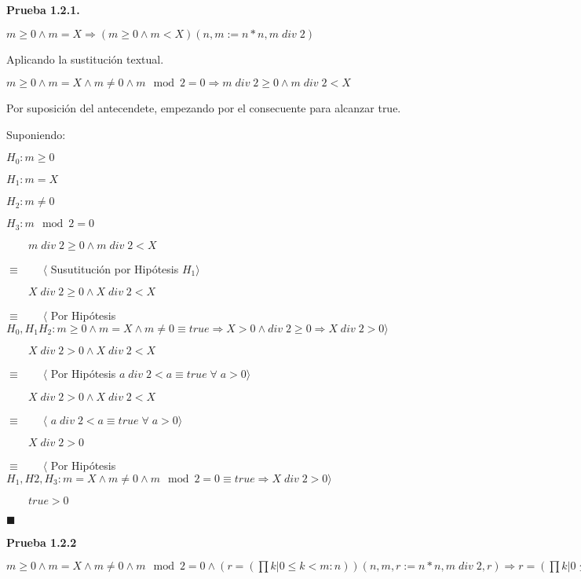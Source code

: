 \documentclass[hidelinks]{article}
\begin{document}
\textbf{Prueba 1.2.1.}\par
$m \geq 0 \land m = X \Rightarrow (m \geq 0 \land m < X)(n,m := n * n, m \; div \; 2)$\par
Aplicando la sustitución textual.\par
$m \geq 0 \land m = X \land m \neq 0 \land m \mod 2 = 0 \Rightarrow m \; div \; 2 \geq 0 \land m \; div \; 2 < X$\par

Por suposición del antecendete, empezando por el consecuente para alcanzar
true.\par

Suponiendo:\par
$H_0: m \geq 0$\par
$H_1: m = X$\par
$H_2: m \neq 0$\par
$H_3: m \mod 2 = 0$\par

$\qquad m \; div \; 2 \geq 0 \land m \; div \; 2 < X$\par
$\equiv \qquad \langle$ Susutitución por Hipótesis $H_1\rangle$\par
$\qquad X \; div \; 2 \geq 0 \land X \; div \; 2 < X$\par
$\equiv \qquad \langle$ Por Hipótesis $H_0, H_1 H_2: m \geq 0 \land m = X \land m \neq 0 \equiv true \Rightarrow X > 0 \land div \; 2 \geq 0 \Rightarrow X \; div \; 2 > 0 \rangle$\par
$\qquad X \; div \; 2 > 0 \land X \; div \; 2 < X$\par
$\equiv \qquad \langle$ Por Hipótesis $a \; div \; 2 < a \equiv true \; \forall \; a > 0 \rangle$\par
$\qquad X \; div \; 2 > 0 \land X \; div \; 2 < X$\par
$\equiv \qquad \langle$ $a \; div \; 2 < a \equiv true \; \forall \; a > 0 \rangle$\par
$\qquad X \; div \; 2 > 0$\par
$\equiv \qquad \langle$ Por Hipótesis $H_1, H2, H_3: m = X \land m \neq 0 \land m \mod 2 = 0 \equiv true \Rightarrow X \; div \; 2 > 0 \rangle$\par
$\qquad true > 0$\par
$\blacksquare$\par

\textbf{Prueba 1.2.2}\par

$m \geq 0 \land m = X \land m \neq 0 \land m \mod 2 = 0 \land (r = (\prod k | 0 \leq k < m: n))(n, m, r := n*n,m \; div \; 2, r) \Rightarrow r = (\prod k | 0 \leq k < m: n) $\par
\end{document}
